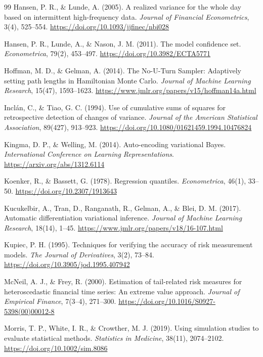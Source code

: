 \documentclass[12pt,a4paper]{article}
\theoremstyle{definition}
\theoremstyle{remark}
\begin{document}
\begin{thebibliography}{99}
 Hansen, P. R., \& Lunde, A. (2005). A realized variance for the whole day based on intermittent high-frequency data. \emph{Journal of Financial Econometrics}, 3(4), 525--554. \url{https://doi.org/10.1093/jjfinec/nbi028}

 Hansen, P. R., Lunde, A., \& Nason, J. M. (2011). The model confidence set. \emph{Econometrica}, 79(2), 453--497. \url{https://doi.org/10.3982/ECTA5771}

 Hoffman, M. D., \& Gelman, A. (2014). The No-U-Turn Sampler: Adaptively setting path lengths in Hamiltonian Monte Carlo. \emph{Journal of Machine Learning Research}, 15(47), 1593--1623. \url{https://www.jmlr.org/papers/v15/hoffman14a.html}

 Inclán, C., \& Tiao, G. C. (1994). Use of cumulative sums of squares for retrospective detection of changes of variance. \emph{Journal of the American Statistical Association}, 89(427), 913--923. \url{https://doi.org/10.1080/01621459.1994.10476824}

 Kingma, D. P., \& Welling, M. (2014). Auto-encoding variational Bayes. \emph{International Conference on Learning Representations}. \url{https://arxiv.org/abs/1312.6114}

 Koenker, R., \& Bassett, G. (1978). Regression quantiles. \emph{Econometrica}, 46(1), 33--50. \url{https://doi.org/10.2307/1913643}

 Kucukelbir, A., Tran, D., Ranganath, R., Gelman, A., \& Blei, D. M. (2017). Automatic differentiation variational inference. \emph{Journal of Machine Learning Research}, 18(14), 1--45. \url{https://www.jmlr.org/papers/v18/16-107.html}

 Kupiec, P. H. (1995). Techniques for verifying the accuracy of risk measurement models. \emph{The Journal of Derivatives}, 3(2), 73--84. \url{https://doi.org/10.3905/jod.1995.407942}

 McNeil, A. J., \& Frey, R. (2000). Estimation of tail-related risk measures for heteroscedastic financial time series: An extreme value approach. \emph{Journal of Empirical Finance}, 7(3--4), 271--300. \url{https://doi.org/10.1016/S0927-5398(00)00012-8}

 Morris, T. P., White, I. R., \& Crowther, M. J. (2019). Using simulation studies to evaluate statistical methods. \emph{Statistics in Medicine}, 38(11), 2074--2102. \url{https://doi.org/10.1002/sim.8086}


\end{thebibliography}
\end{document}
